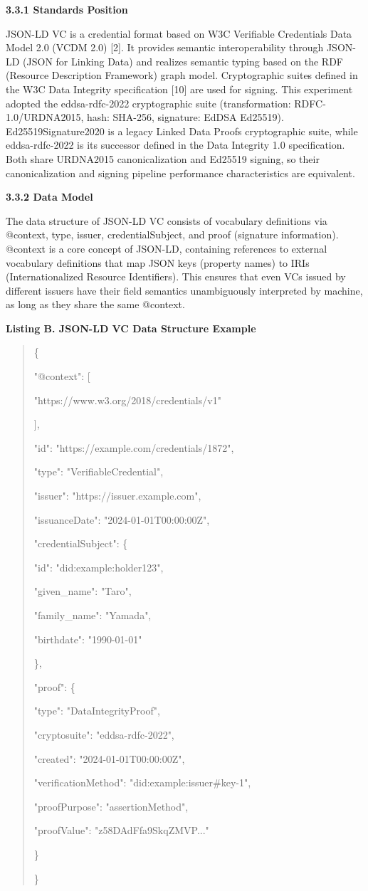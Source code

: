 \textbf{3.3.1 Standards Position}

JSON-LD VC is a credential format based on W3C Verifiable Credentials Data Model 2.0 (VCDM 2.0) {[}2{]}. It provides semantic interoperability through JSON-LD (JSON for Linking Data) and realizes semantic typing based on the RDF (Resource Description Framework) graph model. Cryptographic suites defined in the W3C Data Integrity specification {[}10{]} are used for signing. This experiment adopted the eddsa-rdfc-2022 cryptographic suite (transformation: RDFC-1.0/URDNA2015, hash: SHA-256, signature: EdDSA Ed25519). Ed25519Signature2020 is a legacy Linked Data Proofs cryptographic suite, while eddsa-rdfc-2022 is its successor defined in the Data Integrity 1.0 specification. Both share URDNA2015 canonicalization and Ed25519 signing, so their canonicalization and signing pipeline performance characteristics are equivalent.

\textbf{3.3.2 Data Model}

The data structure of JSON-LD VC consists of vocabulary definitions via @context, type, issuer, credentialSubject, and proof (signature information). @context is a core concept of JSON-LD, containing references to external vocabulary definitions that map JSON keys (property names) to IRIs (Internationalized Resource Identifiers). This ensures that even VCs issued by different issuers have their field semantics unambiguously interpreted by machine, as long as they share the same @context.

\textbf{Listing B. JSON-LD VC Data Structure Example}

\begin{quote}
\{

"@context": {[}

"https://www.w3.org/2018/credentials/v1"

{]},

"id": "https://example.com/credentials/1872",

"type": "VerifiableCredential",

"issuer": "https://issuer.example.com",

"issuanceDate": "2024-01-01T00:00:00Z",

"credentialSubject": \{

"id": "did:example:holder123",

"given\_name": "Taro",

"family\_name": "Yamada",

"birthdate": "1990-01-01"

\},

"proof": \{

"type": "DataIntegrityProof",

"cryptosuite": "eddsa-rdfc-2022",

"created": "2024-01-01T00:00:00Z",

"verificationMethod": "did:example:issuer\#key-1",

"proofPurpose": "assertionMethod",

"proofValue": "z58DAdFfa9SkqZMVP..."

\}

\}
\end{quote}

